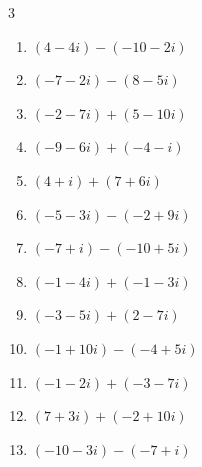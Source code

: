 \begin{multicols}{3}
\begin{enumerate}
  \item $\displaystyle (4-4i) - (-10-2i)$

        \phantom{$\displaystyle =14-2i$}

  \item $\displaystyle (-7-2i) - (8-5i)$

        \phantom{$\displaystyle =-15+3i$}

  \item $\displaystyle (-2-7i) + (5-10i)$

        \phantom{$\displaystyle =3-17i$}

  \item $\displaystyle (-9-6i) + (-4-i)$

        \phantom{$\displaystyle =-13-7i$}

  \item $\displaystyle (4+i) + (7+6i)$

        \phantom{$\displaystyle =11+7i$}

  \item $\displaystyle (-5-3i) - (-2+9i)$

        \phantom{$\displaystyle =-3-12i$}

  \item $\displaystyle (-7+i) - (-10+5i)$

        \phantom{$\displaystyle =3-4i$}

  \item $\displaystyle (-1-4i) + (-1-3i)$

        \phantom{$\displaystyle =-2-7i$}

  \item $\displaystyle (-3-5i) + (2-7i)$

        \phantom{$\displaystyle =-1-12i$}

  \item $\displaystyle (-1+10i) - (-4+5i)$

        \phantom{$\displaystyle =3+5i$}

\columnbreak %

\resetques

  \item $\displaystyle (-1-2i) + (-3-7i)$

        \phantom{$\displaystyle =-4-9i$}

  \item $\displaystyle (7+3i) + (-2+10i)$

        \phantom{$\displaystyle =5+13i$}

  \item $\displaystyle (-10-3i) - (-7+i)$


\end{enumerate}
\end{multicols}
